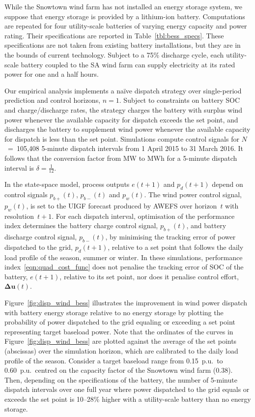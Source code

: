 \documentclass[conference]{IEEEtran}
\def\mwmwh{\delta}
\begin{document}
While the Snowtown wind farm has not installed an energy storage system, we suppose that energy storage is provided by a lithium-ion battery.  Computations are repeated for four utility-scale batteries of varying energy capacity and power rating.  Their specifications are reported in Table~\ref{tbl:bess_specs}.  These specifications are not taken from existing battery installations, but they are in the bounds of current technology.  Subject to a 75\% discharge cycle, each utility-scale battery coupled to the SA wind farm can supply electricity at its rated power for one and a half hours.

Our empirical analysis implements a na\"ive dispatch strategy over single-period prediction and control horizons, $n=1$.  Subject to constraints on battery SOC and charge/discharge rates, the strategy charges the battery with surplus wind power whenever the available capacity for dispatch exceeds the set point, and discharges the battery to supplement wind power whenever the available capacity for dispatch is less than the set point.  Simulations compute control signals for $N$~=~105,408 5-minute dispatch intervals from 1 April 2015 to 31 March 2016.  It follows that the conversion factor from MW to MWh for a 5-minute dispatch interval is $\mwmwh = \tfrac{1}{12}$.  

In the state-space model, process outputs $e(t\!+\!1)$ and $p_{d}(t\!+\!1)$ depend on control signals $p_{b+}(t)$, $p_{b-}(t)$ and $p_{w}(t)$.  The wind power control signal, $p_{w}(t)$, is set to the UIGF forecast produced by AWEFS over horizon~$t$ with resolution~$t\!+\!1$.  For each dispatch interval, optimisation of the performance index determines the battery charge control signal, $p_{b+}(t)$, and battery discharge control signal, $p_{b-}(t)$, by minimising the tracking error of power dispatched to the grid, $p_{d}(t\!+\!1)$, relative to a set point that follows the daily load profile of the season, summer or winter.  In these simulations, performance index~\eqref{eqn:quad_cost_func} does not penalise the tracking error of SOC of the battery, $e(t\!+\!1)$, relative to its set point, nor does it penalise control effort, $\boldsymbol{\Delta{u}}(t)$.

Figure~\ref{fig:disp_wind_bess} illustrates the improvement in wind power dispatch with battery energy storage relative to no energy storage by plotting the probability of power dispatched to the grid equaling or exceeding a set point representing target baseload power.  Note that the ordinates of the curves in Figure~\ref{fig:disp_wind_bess} are plotted against the average of the set points (abscissas) over the simulation horizon, which are calibrated to the daily load profile of the season.  Consider a target baseload range from 0.15~p.u.\ to 0.60~p.u.\ centred on the capacity factor of the Snowtown wind farm (0.38).  Then, depending on the specifications of the battery, the number of 5-minute dispatch intervals over one full year where power dispatched to the grid equals or exceeds the set point is 10--28\% higher with a utility-scale battery than no energy storage.
\end{document}
